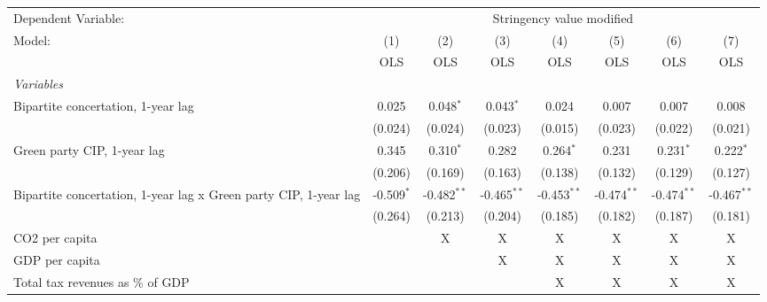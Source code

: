 
\begingroup
\centering
\begin{tabular}{lccccccc}
   \toprule
   Dependent Variable: & \multicolumn{7}{c}{Stringency value modified}\\
   Model:                                                           & (1)          & (2)           & (3)           & (4)           & (5)           & (6)           & (7)\\  
                                                                    &  OLS         & OLS           & OLS           & OLS           & OLS           & OLS           & OLS\\  
   \midrule
   \emph{Variables}\\
   Bipartite concertation, 1-year lag                               & 0.025        & 0.048$^{*}$   & 0.043$^{*}$   & 0.024         & 0.007         & 0.007         & 0.008\\   
                                                                    & (0.024)      & (0.024)       & (0.023)       & (0.015)       & (0.023)       & (0.022)       & (0.021)\\   
   Green party CIP, 1-year lag                                      & 0.345        & 0.310$^{*}$   & 0.282         & 0.264$^{*}$   & 0.231         & 0.231$^{*}$   & 0.222$^{*}$\\   
                                                                    & (0.206)      & (0.169)       & (0.163)       & (0.138)       & (0.132)       & (0.129)       & (0.127)\\   
   Bipartite concertation, 1-year lag x Green party CIP, 1-year lag & -0.509$^{*}$ & -0.482$^{**}$ & -0.465$^{**}$ & -0.453$^{**}$ & -0.474$^{**}$ & -0.474$^{**}$ & -0.467$^{**}$\\   
                                                                    & (0.264)      & (0.213)       & (0.204)       & (0.185)       & (0.182)       & (0.187)       & (0.181)\\   
   CO2 per capita                                                   &              & X             & X             & X             & X             & X             & X\\  
   GDP per capita                                                   &              &               & X             & X             & X             & X             & X\\  
   Total tax revenues as \% of GDP                                  &              &               &               & X             & X             & X             & X\\  

\end{tabular}
